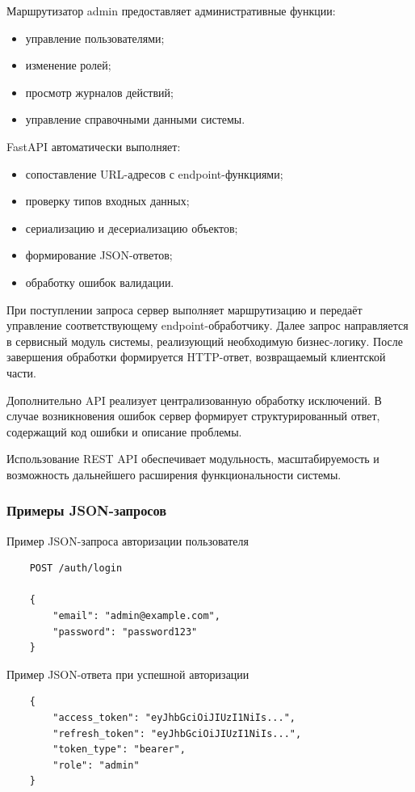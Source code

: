 Маршрутизатор admin предоставляет административные функции:
\begin{itemize}
	\item управление пользователями;
	\item изменение ролей;
	\item просмотр журналов действий;
	\item управление справочными данными системы.
\end{itemize}

FastAPI автоматически выполняет:
\begin{itemize}
	\item сопоставление URL-адресов с endpoint-функциями;
	\item проверку типов входных данных;
	\item сериализацию и десериализацию объектов;
	\item формирование JSON-ответов;
	\item обработку ошибок валидации.
\end{itemize}

При поступлении запроса сервер выполняет маршрутизацию и передаёт управление соответствующему endpoint-обработчику. Далее запрос направляется в сервисный модуль системы, реализующий необходимую бизнес-логику. После завершения обработки формируется HTTP-ответ, возвращаемый клиентской части.

Дополнительно API реализует централизованную обработку исключений. В случае возникновения ошибок сервер формирует структурированный ответ, содержащий код ошибки и описание проблемы.

Использование REST API обеспечивает модульность, масштабируемость и возможность дальнейшего расширения функциональности системы.

\subsubsection{Примеры JSON-запросов}
Пример JSON-запроса авторизации пользователя

\begin{verbatim}
	POST /auth/login
	
	{
		"email": "admin@example.com",
		"password": "password123"
	}
\end{verbatim}

Пример JSON-ответа при успешной авторизации

\begin{verbatim}
	{
		"access_token": "eyJhbGciOiJIUzI1NiIs...",
		"refresh_token": "eyJhbGciOiJIUzI1NiIs...",
		"token_type": "bearer",
		"role": "admin"
	}
\end{verbatim}

